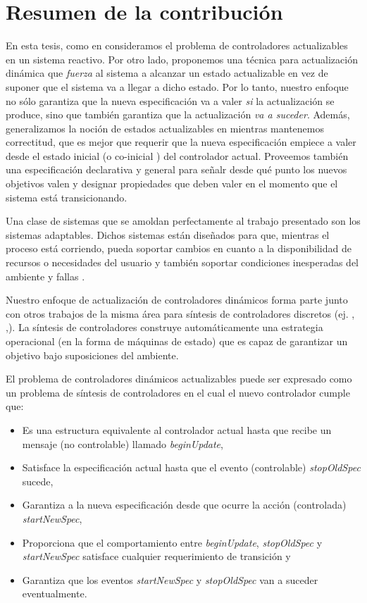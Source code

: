 \section{Resumen de la contribución}

En esta tesis, como en \cite{6224401,PanzicaLaManna:2013:FCC:2487336.2487349} consideramos el problema de controladores
actualizables en un sistema reactivo. Por otro lado, proponemos una técnica para actualización dinámica que
\emph{fuerza} al sistema a alcanzar un estado actualizable en vez de suponer que el sistema va a llegar a dicho estado.
Por lo tanto, nuestro enfoque no sólo garantiza que la nueva especificación va a valer \emph{si} la actualización se
produce, sino que también garantiza que la actualización \emph{va a suceder}. Además, generalizamos la noción de estados
actualizables en \cite{6224401,PanzicaLaManna:2013:FCC:2487336.2487349} mientras mantenemos correctitud, que es mejor que
requerir que la nueva especificación empiece a valer desde el estado inicial (o co-inicial 
\cite{PanzicaLaManna:2013:FCC:2487336.2487349}) del controlador actual. Proveemos también una especificación declarativa
y general para señalr desde qué punto los nuevos objetivos valen y designar propiedades que deben valer en el momento
que el sistema está transicionando. 

Una clase de sistemas que se amoldan perfectamente al trabajo presentado son los sistemas adaptables. Dichos sistemas están diseñados
para que, mientras el proceso está corriendo, pueda soportar cambios en cuanto a la disponibilidad de recursos o 
necesidades del usuario y también soportar condiciones inesperadas del ambiente y fallas \cite{SEAMS}. 

Nuestro enfoque de actualización de controladores dinámicos forma parte junto con otros trabajos de la misma área para
síntesis de controladores discretos (ej. \cite{21072}, \cite{Piterman},\cite{D'ippolito:2013:SNE:2430536.2430543}).
La síntesis de controladores construye automáticamente una estrategia operacional (en la forma de máquinas de estado) que
es capaz de garantizar un objetivo bajo suposiciones del ambiente.

El problema de controladores dinámicos actualizables puede ser expresado como un problema de síntesis de controladores
en el cual el nuevo controlador cumple que:

\begin{itemize}
\itemsep-4mm
\item Es una estructura equivalente al controlador actual hasta que recibe un mensaje (no controlable) llamado
\emph{beginUpdate},
\item Satisface la especificación actual hasta que el evento (controlable) \emph{stopOldSpec} sucede,
\item Garantiza a la nueva especificación desde que ocurre la acción (controlada) \emph{startNewSpec},
\item Proporciona que el comportamiento entre \emph{beginUpdate}, \emph{stopOldSpec} y \emph{startNewSpec} satisface
cualquier requerimiento de transición y
\item Garantiza que los eventos \emph{startNewSpec} y \emph{stopOldSpec} van a suceder eventualmente.
\end{itemize}


